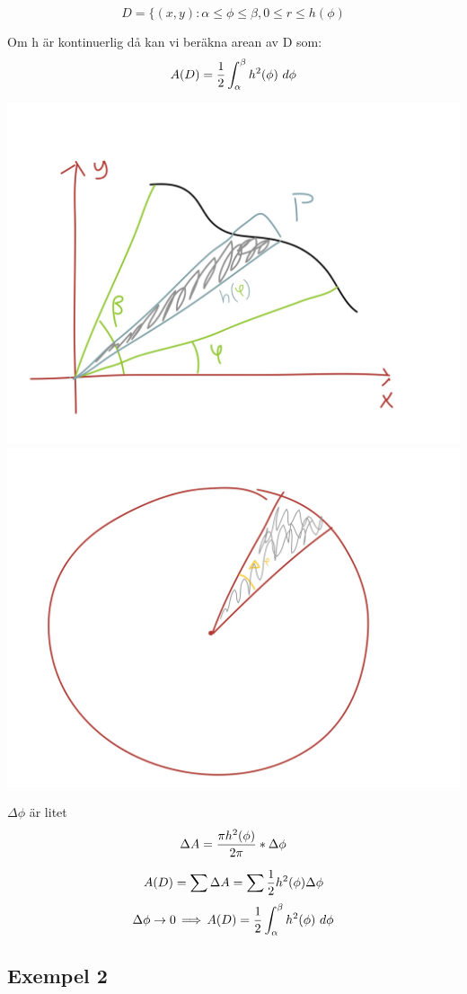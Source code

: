 \documentclass{article}
\begin{document}
$$ D = \{ (x, y) : \alpha\le\phi\le\beta, 0\le r\le h(\phi) $$

Om h är kontinuerlig då kan vi beräkna arean av D som:
$$ A(D) = \f 12 \int^\beta_\alpha{h^2(\phi)\ d\phi} $$

\includegraphics[scale=0.1]{img/img7.jpg}
\includegraphics[scale=0.1]{img/img8.jpg}

$\Delta\phi$ är litet
$$ \Delta A = \frac{\pi h^2(\phi)}{2\pi} * \Delta\phi $$

$$ A(D) = \sum \Delta A = \sum \frac{1}{2} h^2(\phi)\Delta\phi $$
$$ \Delta\phi \to 0 \operatorname{\implies} A(D) = \frac{1}{2} \int^\beta_\alpha{h^2(\phi)\ d\phi} $$

\subsection{Exempel 2}
\end{document}
